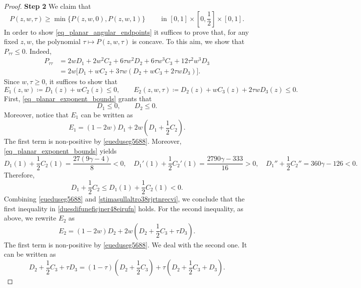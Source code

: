 \documentclass[11pt]{amsart}
\renewcommand{\leq}{\leqslant}
\renewcommand{\geq}{\geqslant}
\renewcommand{\le}{<}
\renewcommand{\ge}{>}
\theoremstyle{definition}
\theoremstyle{remark}
\numberwithin{equation}{section}
\begin{document}
\begin{proof}
\smallskip
\noindent\textbf{Step 2}
We claim that 
\begin{equation}\label{eq_planar_angular_endpoints}
    P(z,w,\tau)\geq\min\{P(z,w,0),P(z,w,1)\}\qquad\text{ in }[0,1]\times\left[0,\frac{1}{2}\right]\times [0,1].
\end{equation}
In order to show \eqref{eq_planar_angular_endpoints} it suffices to prove that, for any fixed $z,w$, the polynomial $\tau\mapsto P(z,w,\tau)$ is concave. To this aim, we show that $P_{\tau\tau}\leq 0$. Indeed,
\[
\begin{aligned}
P_{\tau\tau}
&=2wD_1+2w^2C_2+6\tau w^2D_2
  +6\tau w^3C_3+12\tau^2w^3D_3\\
&=2w\big[D_1+wC_2
  +3\tau w(D_2+wC_3+2\tau wD_3)\big].
\end{aligned}
\]
Since \(w,\tau\geq0\), it suffices to show that
\begin{equation}
\label{duesdifuneficjner48eirufn}
E_1(z,w)\coloneqq D_1(z)+wC_2(z)\leq0,
\qquad
E_2(z,w,\tau)\coloneqq D_2(z)+wC_3(z)+2\tau wD_3(z)\leq0.
\end{equation}
First, \eqref{eq_planar_exponent_bounds} grants that 
\begin{equation}\label{eueduseg5688}
    D_1\leq 0,\qquad D_2\leq 0.
\end{equation}
Moreover, notice that $E_1$ can be written as
\[
E_1
=(1-2w)D_1+2w\left(D_1+\frac12C_2\right).
\]
The first term is non-positive by \eqref{eueduseg5688}. Moreover, \eqref{eq_planar_exponent_bounds} yields
\begin{equation*}
    D_1(1)+\frac12C_2(1)
=\frac{27(9\gamma-4)}8\le 0,\quad D_1'(1)+\frac12C_2'(1)
=\frac{2790\gamma-333}{16}\ge 0,\quad D_1''+\frac12C_2''
=360\gamma-126\le 0.
\end{equation*}
Therefore,
\begin{equation}\label{stimasullaltro38rjrtnrecvi}
     D_1+\frac12C_2\leq  D_1(1)+\frac12C_2(1)\le 0.
\end{equation}
Combining \eqref{eueduseg5688} and \eqref{stimasullaltro38rjrtnrecvi}, we conclude that the first inequality in \eqref{duesdifuneficjner48eirufn} holds.
For the second inequality, as above, we rewrite $E_2$ as 
\begin{equation*}
    E_2=(1-2w)D_2+2w\left(D_2+\frac{1}{2}C_3+\tau D_3\right).
\end{equation*}
The first term is non-positive by \eqref{eueduseg5688}. We deal with the second one. It can be written as 
\[
D_2+\frac12C_3+\tau D_3
=(1-\tau)\left(D_2+\frac12C_3\right)
+\tau\left(D_2+\frac12C_3+D_3\right).
\]
\end{proof}
\end{document}
